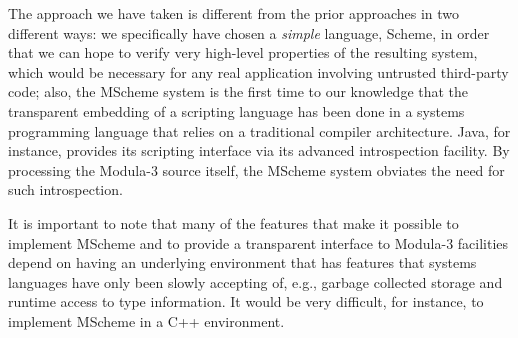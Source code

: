The approach we have taken is different from the prior approaches in two
different ways: we specifically have chosen a {\em simple\/} language,
Scheme, in order that we can hope to verify very high-level properties
of the resulting system, which would be necessary for any real application
involving untrusted third-party code; also, the MScheme system is the
first time to our knowledge that the transparent embedding of a scripting
language has been done in a systems programming language that relies on
a traditional compiler architecture.  Java, for instance, provides its
scripting interface via its advanced introspection facility.  By processing
the Modula-3 source itself, the MScheme system obviates the need for such
introspection.

It is important to note that many of the features that make it
possible to implement MScheme and to provide a transparent interface
to Modula-3 facilities depend on having an underlying environment that
has features that systems languages have only been slowly accepting
of, e.g., garbage collected storage and runtime access to type information.  It
would be very difficult, for instance, to implement MScheme in a C++
environment.
